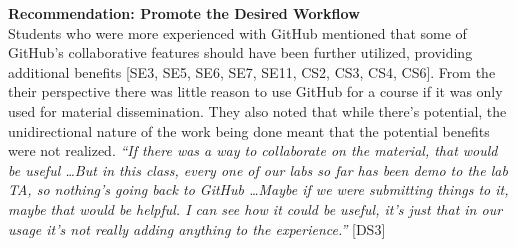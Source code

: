 \textbf{Recommendation: Promote the Desired Workflow}\\
Students who were more experienced with GitHub mentioned that some of GitHub's collaborative features should have been further utilized, providing additional benefits [SE3, SE5, SE6, SE7, SE11, CS2, CS3, CS4, CS6]. From the their perspective there was little reason to use GitHub for a course if it was only used for material dissemination. They also noted that while there's potential, the unidirectional nature of the work being done meant that the potential benefits were not realized. \textit{``If there was a way to collaborate on the material, that would be useful \ldots But in this class, every one of our labs so far has been demo to the lab TA, so nothing's going back to GitHub \ldots Maybe if we were submitting things to it, maybe that would be helpful. I can see how it could be useful, it's just that in our usage it's not really adding anything to the experience.''} [DS3]



